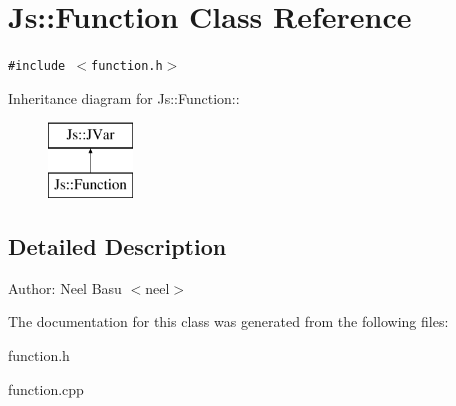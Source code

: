 \section{Js::Function Class Reference}
\label{classJs_1_1Function}
{\tt \#include $<$function.h$>$}

Inheritance diagram for Js::Function::\begin{figure}[H]
\begin{center}
\leavevmode
\includegraphics[height=2cm]{classJs_1_1Function}
\end{center}
\end{figure}


\subsection{Detailed Description}
\begin{Desc}
\item[Author:]Neel Basu $<$neel$>$ \end{Desc}


The documentation for this class was generated from the following files:\begin{CompactItemize}
\item 
function.h\item 
function.cpp\end{CompactItemize}
